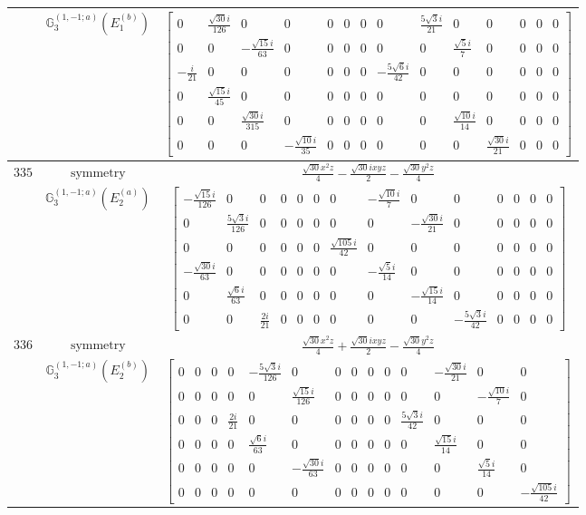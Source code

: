 \documentclass[fleqn,8pt,landscape]{jsarticle}
\begin{document}
\begin{longtable}{ccc}
$  $ & $ \mathbb{G}_{3}^{(1,-1;a)}(E_{1}^{(b)}) $ & $ \begin{bmatrix} 0 & \frac{\sqrt{30} i}{126} & 0 & 0 & 0 & 0 & 0 & 0 & \frac{5 \sqrt{3} i}{21} & 0 & 0 & 0 & 0 & 0 \\ 0 & 0 & - \frac{\sqrt{15} i}{63} & 0 & 0 & 0 & 0 & 0 & 0 & \frac{\sqrt{5} i}{7} & 0 & 0 & 0 & 0 \\ - \frac{i}{21} & 0 & 0 & 0 & 0 & 0 & 0 & - \frac{5 \sqrt{6} i}{42} & 0 & 0 & 0 & 0 & 0 & 0 \\ 0 & \frac{\sqrt{15} i}{45} & 0 & 0 & 0 & 0 & 0 & 0 & 0 & 0 & 0 & 0 & 0 & 0 \\ 0 & 0 & \frac{\sqrt{30} i}{315} & 0 & 0 & 0 & 0 & 0 & 0 & \frac{\sqrt{10} i}{14} & 0 & 0 & 0 & 0 \\ 0 & 0 & 0 & - \frac{\sqrt{10} i}{35} & 0 & 0 & 0 & 0 & 0 & 0 & \frac{\sqrt{30} i}{21} & 0 & 0 & 0 \end{bmatrix} $ \\ \hline
$ 335 $ & $ \text{symmetry} $ & $ \frac{\sqrt{30} x^{2} z}{4} - \frac{\sqrt{30} i x y z}{2} - \frac{\sqrt{30} y^{2} z}{4} $ \\
$  $ & $ \mathbb{G}_{3}^{(1,-1;a)}(E_{2}^{(a)}) $ & $ \begin{bmatrix} - \frac{\sqrt{15} i}{126} & 0 & 0 & 0 & 0 & 0 & 0 & - \frac{\sqrt{10} i}{7} & 0 & 0 & 0 & 0 & 0 & 0 \\ 0 & \frac{5 \sqrt{3} i}{126} & 0 & 0 & 0 & 0 & 0 & 0 & - \frac{\sqrt{30} i}{21} & 0 & 0 & 0 & 0 & 0 \\ 0 & 0 & 0 & 0 & 0 & 0 & \frac{\sqrt{105} i}{42} & 0 & 0 & 0 & 0 & 0 & 0 & 0 \\ - \frac{\sqrt{30} i}{63} & 0 & 0 & 0 & 0 & 0 & 0 & - \frac{\sqrt{5} i}{14} & 0 & 0 & 0 & 0 & 0 & 0 \\ 0 & \frac{\sqrt{6} i}{63} & 0 & 0 & 0 & 0 & 0 & 0 & - \frac{\sqrt{15} i}{14} & 0 & 0 & 0 & 0 & 0 \\ 0 & 0 & \frac{2 i}{21} & 0 & 0 & 0 & 0 & 0 & 0 & - \frac{5 \sqrt{3} i}{42} & 0 & 0 & 0 & 0 \end{bmatrix} $ \\ \hline
$ 336 $ & $ \text{symmetry} $ & $ \frac{\sqrt{30} x^{2} z}{4} + \frac{\sqrt{30} i x y z}{2} - \frac{\sqrt{30} y^{2} z}{4} $ \\
$  $ & $ \mathbb{G}_{3}^{(1,-1;a)}(E_{2}^{(b)}) $ & $ \begin{bmatrix} 0 & 0 & 0 & 0 & - \frac{5 \sqrt{3} i}{126} & 0 & 0 & 0 & 0 & 0 & 0 & - \frac{\sqrt{30} i}{21} & 0 & 0 \\ 0 & 0 & 0 & 0 & 0 & \frac{\sqrt{15} i}{126} & 0 & 0 & 0 & 0 & 0 & 0 & - \frac{\sqrt{10} i}{7} & 0 \\ 0 & 0 & 0 & \frac{2 i}{21} & 0 & 0 & 0 & 0 & 0 & 0 & \frac{5 \sqrt{3} i}{42} & 0 & 0 & 0 \\ 0 & 0 & 0 & 0 & \frac{\sqrt{6} i}{63} & 0 & 0 & 0 & 0 & 0 & 0 & \frac{\sqrt{15} i}{14} & 0 & 0 \\ 0 & 0 & 0 & 0 & 0 & - \frac{\sqrt{30} i}{63} & 0 & 0 & 0 & 0 & 0 & 0 & \frac{\sqrt{5} i}{14} & 0 \\ 0 & 0 & 0 & 0 & 0 & 0 & 0 & 0 & 0 & 0 & 0 & 0 & 0 & - \frac{\sqrt{105} i}{42} \end{bmatrix} $ \\ \hline

\end{longtable}
\end{document}
